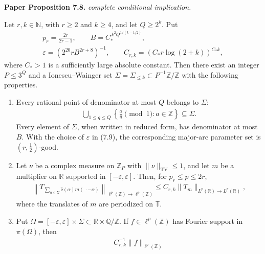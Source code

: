 \begin{lemma}
\label{iw_application}
\leanok
\par\medskip\noindent\textbf{Paper Proposition 7.8.} \textit{complete conditional implication.}\par
Let \(r,k\in\mathbb N\), with \(r\geq2\) and \(k\geq4\),
and let \(Q\geq2^k\). Put
\begin{equation}
 \begin{gathered}
 p_r=\frac{2r}{2r-1},
 \qquad B=C_*^{\,k^2Q^{1/(k-1/2)}},\\
 \varepsilon=(2^{20}rB^{2r+8})^{-1},
 \qquad C_{r,k}=(C_*r\log(2+k))^{C_*k},
 \end{gathered}
\end{equation}
where \(C_*>1\) is a sufficiently large absolute constant.
Then there exist an integer \(P\leq3^Q\) and a
Ionescu--Wainger set
\(\Sigma=\Sigma_{\leq k}\subset P^{-1}\mathbb Z/\mathbb Z\)
with the following properties.
\begin{enumerate}
\item
Every rational point of denominator at most \(Q\) belongs to
\(\Sigma\):
\begin{align}
 \bigcup_{1\leq q\leq Q}
 \left\{\frac aq\pmod1:a\in\mathbb Z\right\}
 \subseteq\Sigma.
\end{align}
Every element of \(\Sigma\), when written in reduced form, has
denominator at most \(B\). With the choice of \(\varepsilon\) in \textup{(7.9)}, the
corresponding major-arc parameter set is
\((r,\frac12)\)-good.
\item
Let \(\nu\) be a complex measure on \(\mathbb Z_P\) with
\(\|\nu\|_{\mathrm{TV}}\leq1\), and let \(m\) be a multiplier on
\(\mathbb R\) supported in \([-\varepsilon,\varepsilon]\).  Then, for
\(p_r\leq p\leq2r\),
\begin{align}
 \left\|
 T_{\displaystyle
   \sum_{\alpha\in\Sigma}
   \widehat\nu(\alpha)m(\,\cdot-\alpha)}
 \right\|_{\ell^p(\mathbb Z)\to\ell^p(\mathbb Z)}
 \leq
  C_{r,k}
 \|T_m\|_{L^p(\mathbb R)\to L^p(\mathbb R)},
\end{align}
where the translates of \(m\) are periodized on \(\mathbb T\).
\item
Put $\Omega=[-\varepsilon,\varepsilon]\times\Sigma
 \subset\mathbb R\times\mathbb Q/\mathbb Z.$
If \(f\in\ell^p(\mathbb Z)\) has Fourier support in
\(\pi(\Omega)\), then
\begin{align}
  C_{r,k}^{-1}\|f\|_{\ell^p(\mathbb Z)}

\end{align}
\end{enumerate}
\end{lemma}

